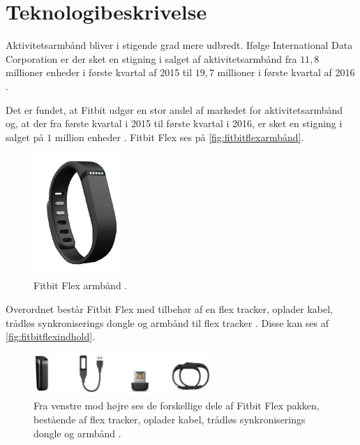 \section{Teknologibeskrivelse} \label{sec:teknologibeskrivelse}
Aktivitetsarmbånd bliver i stigende grad mere udbredt. Ifølge International Data Corporation er der sket en stigning i salget af aktivitetsarmbånd fra $11,8$ millioner enheder i første kvartal af 2015 til $19,7$ millioner i første kvartal af 2016 \citep{IDC2016}.

Det er fundet, at Fitbit udgør en stor andel af markedet for aktivitetsarmbånd og, at der fra første kvartal i 2015 til første kvartal i 2016, er sket en stigning i salget på $1$ million enheder \citep{IDC2016}.  
Fitbit Flex ses på \autoref{fig:fitbitflexarmbånd}. 

\begin{figure}[H]
	\centering
	\includegraphics[width=0.3\textwidth]{figures/fitbitflex}
	\caption{Fitbit Flex armbånd \citep{fitbitflex}.}
	\label{fig:fitbitflexarmbånd}
\end{figure}

\noindent
Overordnet består Fitbit Flex med tilbehør af en flex tracker, oplader kabel, trådløs synkroniserings dongle og armbånd til flex tracker \citep{fitbitflex}. Disse kan ses af \autoref{fig:fitbitflexindhold}. 

\begin{figure}[H]
	\centering
	\includegraphics[width=0.6\textwidth]{figures/fitbitflexindhold}
	\caption{Fra venstre mod højre ses de forskellige dele af Fitbit Flex pakken, bestående af flex tracker, oplader kabel, trådløs synkroniserings dongle og armbånd \citep{fitbitflex}.}
	\label{fig:fitbitflexindhold}
\end{figure}

